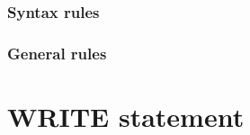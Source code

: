 \begin{syntax}
\end{syntax}

\subsubsection{Syntax rules}

\subsubsection{General rules}

\section{WRITE statement}

